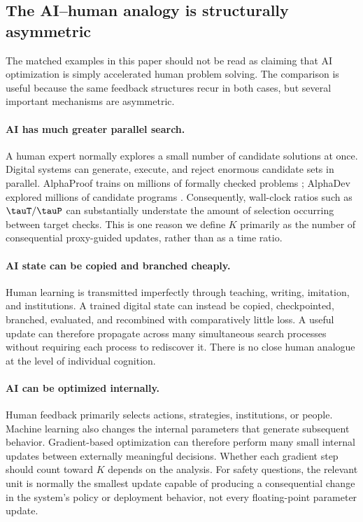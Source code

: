 \subsection{The AI--human analogy is structurally asymmetric}
\label{sec:asymmetries}

The matched examples in this paper should not be read as claiming that AI optimization
is simply accelerated human problem solving.  The comparison is useful because the
same feedback structures recur in both cases, but several important mechanisms are
asymmetric.

\paragraph{AI has much greater parallel search.}
A human expert normally explores a small number of candidate solutions at once.
Digital systems can generate, execute, and reject enormous candidate sets in parallel.
AlphaProof trains on millions of formally checked problems
\parencite{hubert2025alphaproof}; AlphaDev explored millions of candidate programs
\parencite{mankowitz2023alphadev}.  Consequently, wall-clock ratios such as
\(\tauT/\tauP\) can substantially understate the amount of selection occurring
between target checks.  This is one reason we define \(K\) primarily as the number of
consequential proxy-guided updates, rather than as a time ratio.

\paragraph{AI state can be copied and branched cheaply.}
Human learning is transmitted imperfectly through teaching, writing, imitation, and
institutions.  A trained digital state can instead be copied, checkpointed, branched,
evaluated, and recombined with comparatively little loss.  A useful update can
therefore propagate across many simultaneous search processes without requiring each
process to rediscover it.  There is no close human analogue at the level of individual
cognition.

\paragraph{AI can be optimized internally.}
Human feedback primarily selects actions, strategies, institutions, or people.
Machine learning also changes the internal parameters that generate subsequent
behavior.  Gradient-based optimization can therefore perform many small internal
updates between externally meaningful decisions.  Whether each gradient step should
count toward \(K\) depends on the analysis.  For safety questions, the relevant unit
is normally the smallest update capable of producing a consequential change in the
system's policy or deployment behavior, not every floating-point parameter update.

